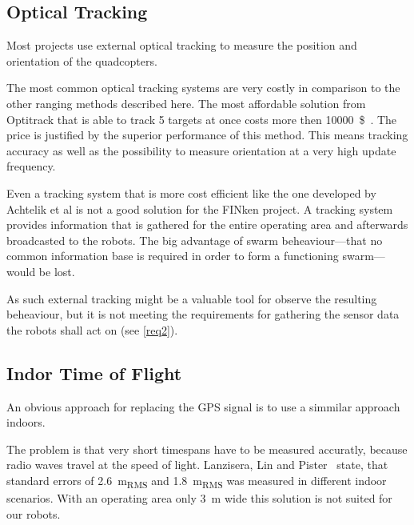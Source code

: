 \subsection{Optical Tracking}

Most projects use external optical tracking to measure the position and orientation of the quadcopters. 

The most common optical tracking systems are very costly in comparison to the other ranging methods described here.
The most affordable solution from Optitrack that is able to track 5 targets at once costs more then \SI{10000}{\$}~\cite{optitrack.com}.
The price is justified by the superior performance of this method.
This means tracking accuracy as well as the possibility to measure orientation at a very high update frequency.


Even a tracking system that is more cost efficient like the one developed by Achtelik et al\cite{Achtelik2009} is not a good solution for the FINken project.
A tracking system provides information that is gathered for the entire operating area and afterwards broadcasted to the robots.
The big advantage of swarm beheaviour—that no common information base is required in order to form a functioning swarm—would be lost.

As such external tracking might be a valuable tool for observe the resulting beheaviour, but it is not meeting the requirements for gathering the sensor data the robots shall act on (see \autoref{req2}).


\subsection{Indor Time of Flight}
An obvious approach for replacing the GPS signal is to use a simmilar approach indoors.

The problem is that very short timespans have to be measured accuratly, because radio waves travel at the speed of light.
Lanzisera, Lin and Pister~\cite{lanzisera2006} state, that standard errors of \SI{2.6}{\metre_{RMS}} and \SI{1.8}{\metre_{RMS}} was measured in different indoor scenarios.
With an operating area only \SI{3}{\metre} wide this solution is not suited for our robots.


